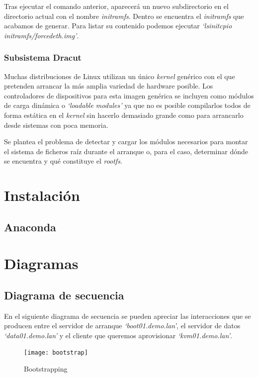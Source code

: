 \documentclass[a4paper,12pt,spanish,final]{epsc_tfc_pfc}
\begin{document}
Tras ejecutar el comando anterior, aparecerá un nuevo subdirectorio en el directorio actual con el nombre \emph{initramfs}. Dentro se encuentra el \emph{initramfs} que acabamos de generar. Para listar su contenido podemos ejecutar \emph{`lsinitcpio initramfs/forcedeth.img'}.

\subsubsection{Subsistema Dracut}
Muchas distribuciones de Linux utilizan un único \emph{kernel} genérico con el que pretenden arrancar la más amplia variedad de hardware posible.
Los controladores de dispositivos para esta imagen genérica se incluyen como módulos de carga dinámica o \emph{`loadable modules'} ya que no es posible compilarlos todos de forma estática en el \emph{kernel} sin hacerlo demasiado grande como para arrancarlo desde sistemas con poca memoria.

Se plantea el problema de detectar y cargar los módulos necesarios para montar el sistema de ficheros raíz durante el arranque o, para el caso, determinar dónde se encuentra y qué constituye el \emph{rootfs}.
\section{Instalación}

\subsection{Anaconda}

\section{Diagramas}

\subsection{Diagrama de secuencia}
En el siguiente diagrama de secuencia se pueden apreciar las interacciones que se producen entre el servidor de arranque \emph{`boot01.demo.lan'}, el servidor de datos \emph{`data01.demo.lan'} y el cliente que queremos aprovisionar \emph{`kvm01.demo.lan'}.

\begin{figure}[h]
  \centering
    \texttt{[image: bootstrap]}
      \caption{Bootstrapping}
\end{figure}

\end{document}
